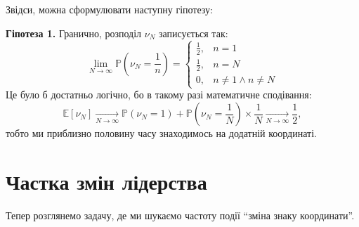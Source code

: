 \documentclass[14pt]{extarticle}
\begin{document}
Звідси, можна сформулювати наступну гіпотезу:

\textbf{Гіпотеза 1.} Гранично, розподіл $\nu_N$ записується так:
\begin{equation}
    \lim_{N \to \infty}\mathbb{P}\left(\nu_N = \frac{1}{n}\right) = \begin{cases}
        \frac{1}{2}, & n = 1 \\
        \frac{1}{2}, & n = N \\
        0, & n \neq 1 \wedge n \neq N
    \end{cases}
\end{equation}
Це було б достатньо логічно, бо в такому разі математичне сподівання:
\begin{equation}
    \mathbb{E}[\nu_N] \xrightarrow[N \to \infty]{} \mathbb{P}(\nu_N = 1) + \mathbb{P}\left(\nu_N = \frac{1}{N}\right) \times \frac{1}{N} \xrightarrow[N \to \infty]{} \frac{1}{2}, 
\end{equation}
тобто ми приблизно половину часу знаходимось на додатній координаті.

\section{Частка змін лідерства}

Тепер розглянемо задачу, де ми шукаємо частоту події ``зміна знаку координати''. 
\end{document}
